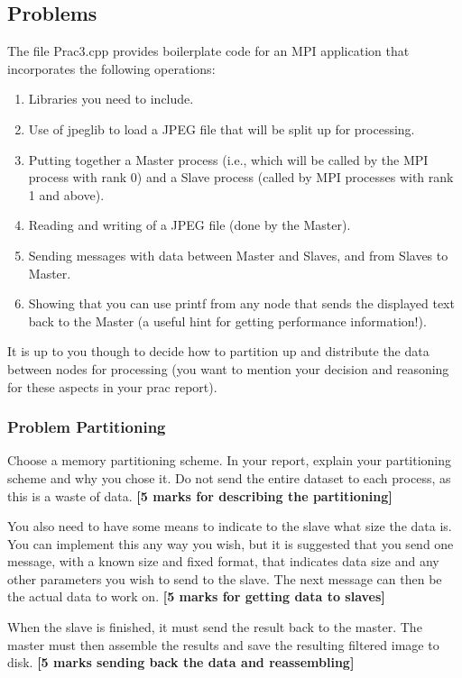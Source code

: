 \subsection{Problems}

The file Prac3.cpp provides boilerplate code for an MPI application that incorporates the following operations:

\begin{enumerate}
	\item Libraries you need to include.
	\item Use of jpeglib to load a JPEG file that will be split up for processing.
	\item Putting together a Master process (i.e., which will be called by the MPI process with rank 0) and a Slave process (called by MPI processes with rank 1 and above).
	\item Reading and writing of a JPEG file (done by the Master).
	\item Sending messages with data between Master and Slaves, and from Slaves to Master.
	\item Showing that you can use printf from any node that sends the displayed text back to the Master (a useful hint for getting performance information!). 
\end{enumerate}

It is up to you though to decide how to partition up and distribute the data between nodes for processing (you want to mention your decision and reasoning for these aspects in your prac report).

\subsubsection{Problem Partitioning}
Choose a memory partitioning scheme. In your report, explain your partitioning scheme and why you chose it. Do not send the entire dataset to each process, as this is a waste of data. \textbf{[5 marks for describing the partitioning]}

You also need to have some means to indicate to the slave what size the data is. You can implement this any way you wish, but it is suggested that you send one message, with a known size and fixed format, that indicates data size and any other parameters you wish to send to the slave. The next message can then be the actual data to work on. \textbf{[5 marks for getting data to slaves]}

When the slave is finished, it must send the result back to the master. The master must then assemble the results and save the resulting filtered image to disk. \textbf{[5 marks sending back the data and reassembling]}

